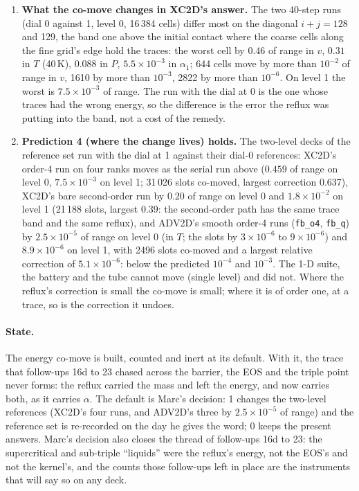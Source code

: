 \documentclass[11pt,a4paper]{article}
\newcommand{\code}[1]{\texttt{\small #1}}
\begin{document}
\begin{enumerate}[nosep]
      register's corrections at round-off before the contact reaches
      the coarse--fine edge).  Rule 7's ledger: every count that
      follow-ups 16d to 23 chased is zero with the energy carried.
\item \textbf{What the co-move changes in XC2D's answer.}  The two
      40-step runs (dial 0 against 1, level 0, 16\,384 cells) differ
      most on the diagonal $i + j = 128$ and 129, the band one above the
      initial contact where the coarse cells along the fine grid's edge
      hold the traces: the worst cell by $0.46$ of range in $v$, $0.31$
      in $T$ (40\,K), $0.088$ in $P$, $5.5\times10^{-3}$ in $\alpha_1$;
      644 cells move by more than $10^{-2}$ of range in $v$, 1610 by
      more than $10^{-3}$, 2822 by more than $10^{-6}$.  On level 1 the
      worst is $7.5\times10^{-3}$ of range.  The run with the dial at 0
      is the one whose traces had the wrong energy, so the difference is
      the error the reflux was putting into the band, not a cost of the
      remedy.
\item \textbf{Prediction 4 (where the change lives) holds.}  The
      two-level decks of the reference set run with the dial at 1
      against their dial-0 references: XC2D's order-4 run on four ranks
      moves as the serial run above ($0.459$ of range on level 0,
      $7.5\times10^{-3}$ on level 1; 31\,026 slots co-moved, largest
      correction 0.637), XC2D's bare second-order run by $0.20$ of range
      on level 0 and $1.8\times10^{-2}$ on level 1 (21\,188 slots,
      largest 0.39: the second-order path has the same trace band and
      the same reflux), and ADV2D's smooth order-4 runs (\code{fb\_o4},
      \code{fb\_q}) by $2.5\times10^{-5}$ of range on level 0 (in $T$;
      the slots by $3\times10^{-6}$ to $9\times10^{-6}$) and
      $8.9\times10^{-6}$ on level 1, with 2496 slots co-moved and a
      largest relative correction of $5.1\times10^{-6}$: below the
      predicted $10^{-4}$ and $10^{-3}$.  The 1-D suite, the battery
      and the tube cannot move (single level) and did not.  Where the
      reflux's correction is small the co-move is small; where it is of
      order one, at a trace, so is the correction it undoes.
\end{enumerate}

\paragraph{State.}  The energy co-move is built, counted and inert
at its default.  With it, the trace that follow-ups 16d to 23 chased
across the barrier, the EOS and the triple point never forms: the
reflux carried the mass and left the energy, and now carries both, as
it carries $\alpha$.  The default is Marc's decision: 1 changes the
two-level references (XC2D's four runs, and ADV2D's three by $2.5\times10^{-5}$ of range)
and the reference set is re-recorded on the day he gives the word; 0
keeps the present answers.  Marc's decision also closes
the thread of follow-ups 16d to 23: the supercritical and sub-triple
``liquids'' were the reflux's energy, not the EOS's and not the
kernel's, and the counts those follow-ups left in place are the
instruments that will say so on any deck.
\end{document}
